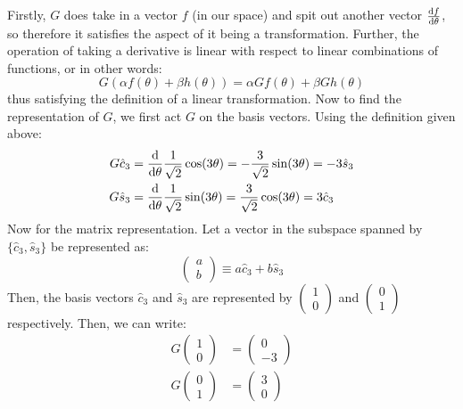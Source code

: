 \documentclass[10pt]{article}
\begin{document}
\begin{enumerate}[label=\alph*)]
			\begin{solution}
				Firstly, $G$ does take in a vector $f$ (in our space) and spit out another vector 
				$\dv{f}{\theta}$, so therefore
				it satisfies the aspect of it being a transformation. Further, the operation of taking a 
				derivative is linear with respect to linear combinations of functions, or in other words:
				\[
				G(\alpha f(\theta) + \beta h(\theta)) = \alpha G f(\theta) + \beta Gh(\theta)
				\] 
				thus satisfying the definition of a linear transformation. Now to find the representation of $G$,
				we first act $G$ on the basis vectors. Using the definition given above:
				\begin{align*}
					G \hat{c}_3 &= \dv{\theta} \frac{1}{\sqrt{2} }\cos(3\theta) = -\frac{3}{\sqrt{2} }\sin(3\theta) = -3 \hat{s}_3\\
					G \hat{s}_3	&= \dv{\theta} \frac{1}{\sqrt{2} }\sin(3\theta) = \frac{3}{\sqrt{2} }\cos(3\theta) = 3 \hat{c}_3
				\end{align*} 
				Now for the matrix representation. Let a vector in the subspace spanned by 
				$\{\hat{c}_3, \hat{s}_3\}$ be represented as:
				\[
				\begin{pmatrix} a\\b \end{pmatrix} \equiv a \hat{c}_3 + b \hat{s}_3
				\] 
				Then, the basis vectors $\hat{c}_3$ and $\hat{s}_3$ are represented by 
				$\begin{pmatrix} 1\\0 \end{pmatrix}$ and $\begin{pmatrix} 0\\1 \end{pmatrix}$ respectively. Then,
				we can write:
				\begin{align*}
					G \begin{pmatrix} 1\\0 \end{pmatrix} &= \begin{pmatrix} 0 \\-3 \end{pmatrix} \\
					G \begin{pmatrix} 0\\1 \end{pmatrix} &= \begin{pmatrix} 3\\0 \end{pmatrix} 
				\end{align*}

\end{solution}
\end{enumerate}
\end{document}
